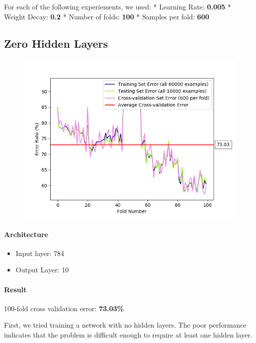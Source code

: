 \documentclass[11pt]{article}
\makeatletter
\def\maxwidth{\ifdim\Gin@nat@width>\linewidth\linewidth
    \else\Gin@nat@width\fi}
\let\Oldincludegraphics\includegraphics
\renewcommand{\includegraphics}[1]{\Oldincludegraphics[width=.8\maxwidth]{#1}}
\providecommand{\tightlist}{%
      \setlength{\itemsep}{0pt}\setlength{\parskip}{0pt}}
\makeatother
\begin{document}
For each of the following experiements, we used: * Learning Rate:
\textbf{0.005} * Weight Decay: \textbf{0.2} * Number of folds:
\textbf{100} * Samples per fold: \textbf{600}

\subsection{Zero Hidden Layers}\label{zero-hidden-layers}

\begin{figure}[htbp]
\centering
\includegraphics{plots/ff-numlayers-0.png}
\end{figure}

\paragraph{Architecture}\label{architecture}

\begin{itemize}
\tightlist
\item
  Input layer: 784
\item
  Output Layer: 10
\end{itemize}

\paragraph{Result}\label{result}

100-fold cross validation error: \textbf{73.03\%}

First, we tried training a network with no hidden layers. The poor
performance indicates that the problem is difficult enough to require at
least one hidden layer.
\end{document}
